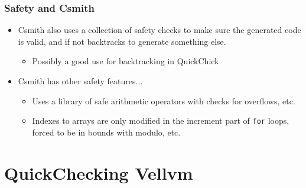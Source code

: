 \documentclass{beamer}
\begin{document}
\begin{frame}
  \frametitle{Safety and Csmith}
  \begin{itemize}
  \item Csmith also uses a collection of safety checks to make sure
    the generated code is valid, and if not backtracks to generate
    something else.
    \begin{itemize}
    \item Possibly a good use for backtracking in QuickChick
    \end{itemize}
  \item Csmith has other safety features...
    \begin{itemize}
    \item Uses a library of safe arithmetic operators with checks for
      overflows, etc.
    \item Indexes to arrays are only modified in the increment part of
      {\tt for} loops, forced to be in bounds with modulo, etc.
    \end{itemize}
  \end{itemize}

\end{frame}





\section{QuickChecking Vellvm}
\end{document}
